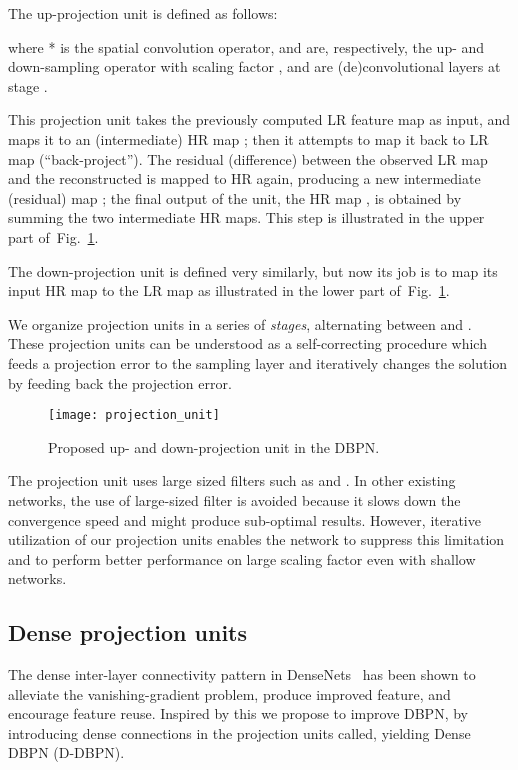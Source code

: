 \documentclass[10pt,twocolumn,letterpaper]{article}
\begin{document}
The up-projection unit is defined as follows:

where * is the spatial convolution operator,  and  are, respectively, the up- and
down-sampling operator with scaling factor , and  are (de)convolutional layers at stage .

This projection unit takes the previously computed LR feature map
 as input, and maps it to an (intermediate) HR map ;
then it attempts to map it back to LR map 
(``back-project''). The residual (difference)  between the observed LR map
 and the reconstructed  is mapped to HR again,
producing a new intermediate (residual) map ; the final output of the unit,
the HR map , is obtained by summing the two intermediate HR maps. This step is illustrated in the upper part of~Fig.~\ref{figure:projection_unit}.

The down-projection unit is defined very similarly, but now its job is
to map its input HR map  to the LR map  as illustrated in the lower part of~Fig.~\ref{figure:projection_unit}.


We organize projection units in a series of \emph{stages}, alternating between  and .
These projection units can be understood as a self-correcting procedure which feeds a projection error to the sampling layer and iteratively changes the solution by feeding back the projection error.

\begin{figure}[t!]
\centering
\texttt{[image: projection\_unit]}
\caption{Proposed up- and down-projection unit in the DBPN.}
\label{figure:projection_unit}
\end{figure}

The projection unit uses large sized filters such as  and . In other existing networks, the use of large-sized filter is avoided because it slows down the convergence speed and might produce sub-optimal results. However, iterative utilization of our projection units enables the network to suppress this limitation and to perform better performance on large scaling factor even with shallow networks.

\subsection{Dense projection units}
The dense inter-layer connectivity pattern in DenseNets~\cite{huang2017densely} has been shown to 
alleviate the vanishing-gradient problem, produce improved feature,
and encourage feature reuse. Inspired by this we propose to improve
DBPN, by introducing dense connections in the projection units called,
yielding Dense DBPN (D-DBPN).
\end{document}
